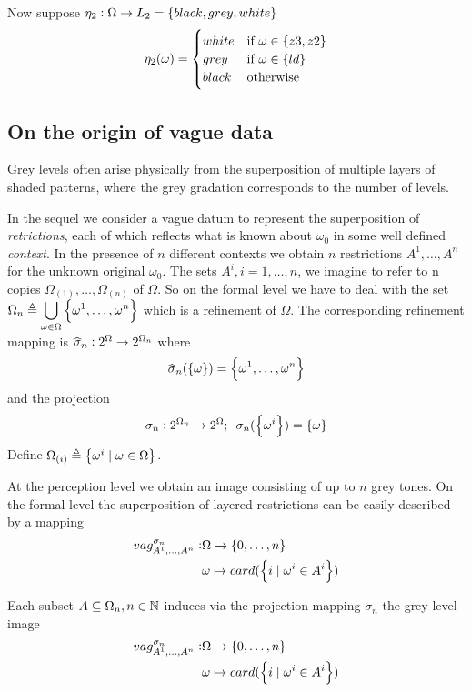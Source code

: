 \documentclass[11pt]{article}
\begin{document}
Now suppose \(\eta_2:\Omega\to L_2=\left\{ black,grey,white\right\}\)
\begin{equation*}
\eta_2(\omega)=
\begin{cases}
white &\text{if } \omega\in\left\{ z3,z2\right\}\\
grey & \text{if } \omega\in\left\{ ld\right\}\\
black&\text{otherwise}
\end{cases}
\end{equation*}
\subsection{On the origin of vague data}
\label{sec:org2adb6b3}
Grey levels often arise physically from the superposition of multiple layers
of shaded patterns, where the grey gradation corresponds to the number of levels.

In the sequel we consider a
vague datum to represent the superposition of \emph{retrictions}, each of which
reflects what is known about \(\omega_0\) in some well defined \emph{context}. 
In the presence of \(n\) different contexts we obtain \(n\) restrictions
\(A^1,\dots,A^n\) for the unknown original \(\omega_0\).
The
sets \(A^i,i=1,\dots,n\), we imagine to refer to n copies
\(\Omega_{(1)},\dots,\Omega_{(n)}\) of \(\Omega\). So on the formal level we have
to deal with the set 
\(\Omega_n\triangleq \displaystyle\bigcup_{\omega\in\Omega}\left\{\omega^1,\dots,\omega^n\right\}\)
which is a refinement of \(\Omega\). The corresponding refinement mapping is
\(\what{\sigma}_n:2^\Omega\to 2^{\Omega_n}\) where
\begin{equation*}
\what{\sigma}_n(\lb\omega\rb)=\lb\omega^1,\dots,\omega^n\rb
\end{equation*}
and the projection
\begin{equation*}
\sigma_n:2^{\Omega_n}\to 2^\Omega;\enspace\sigma_n(\left\{\omega^i\right\})=\left\{\omega\right\}
\end{equation*}
Define \(\Omega_{(i)}\triangleq\left\{\omega^i\mid\omega\in\Omega\right\}\).

At the perception level we obtain an image consisting of up to \(n\) grey tones.
On the formal level the superposition of layered restrictions can be easily
described by a mapping
\begin{align*}
vag^{\sigma_n}_{A^1,\dots,A^n}:&\Omega\to\left\{ 0,\dots,n\right\}\\
&\omega\mapsto card(\left\{ i\mid\omega^i\in A^i\right\})
\end{align*}
\begin{definition}[]
Each subset \(A\subseteq\Omega_n,n\in\mathbb{N}\) induces via the projection mapping
\(\sigma_n\) the grey level image
\begin{align*}
vag^{\sigma_n}_{A^1,\dots,A^n}:&\Omega\to\left\{ 0,\dots,n\right\}\\
&\omega\mapsto card(\left\{ i\mid\omega^i\in A^i\right\})
\end{align*}
\end{definition}
\end{document}

